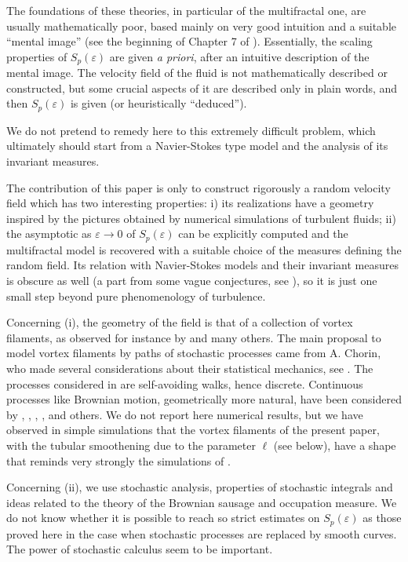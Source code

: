 \documentclass[a4paper,12pt]{article}
\begin{document}
The foundations of these theories, in particular of the multifractal one, are
usually mathematically poor, based mainly on very good intuition and a
suitable ``mental image'' (see the beginning of Chapter 7 of \cite{frisch}).
Essentially, the scaling properties of $S_{p}(\varepsilon)$ are given
\textit{a priori}, after an intuitive description of the mental image. The
velocity field of the fluid is not mathematically described or constructed,
but some crucial aspects of it are described only in plain words, and then
$S_{p}(\varepsilon)$ is given (or heuristically ``deduced'').

We do not pretend to remedy here to this extremely difficult problem, which
ultimately should start from a Navier-Stokes type model and the analysis of
its invariant measures.

The contribution of this paper is only to construct rigorously a random
velocity field which has two interesting properties: i) its realizations have
a geometry inspired by the pictures obtained by numerical simulations of
turbulent fluids; ii) the asymptotic as $\varepsilon\rightarrow0$ of
$S_{p}(\varepsilon)$ can be explicitly computed and the multifractal model is
recovered with a suitable choice of the measures defining the random field.
Its relation with Navier-Stokes models and their invariant measures is obscure
as well (a part from some vague conjectures, see \cite{Fl2}), so it is just
one small step beyond pure phenomenology of turbulence.

Concerning (i), the geometry of the field is that of a collection of vortex
filaments, as observed for instance by \cite{Vincent-Meneg} and many others.
The main proposal to model vortex filaments by paths of stochastic processes
came from A. Chorin, who made several considerations about their statistical
mechanics, see \cite{Ch}. The processes considered in \cite{Ch} are
self-avoiding walks, hence discrete. Continuous processes like Brownian
motion, geometrically more natural, have been considered by \cite{Gallavotti},
\cite{Lions-Majda}, \cite{Fl1}, \cite{FG1}, \cite{Nualart} and others. We do
not report here numerical results, but we have observed in simple simulations
that the vortex filaments of the present paper, with the tubular smoothening
due to the parameter $\ell$ (see below), have a shape that reminds very
strongly the simulations of \cite{Bell-Markus}.

Concerning (ii), we use stochastic analysis, properties of stochastic
integrals and ideas related to the theory of the Brownian sausage and
occupation measure. We do not know whether it is possible to reach so strict
estimates on $S_{p}(\varepsilon)$ as those proved here in the case when
stochastic processes are replaced by smooth curves. The power of stochastic
calculus seem to be important.
\end{document}
